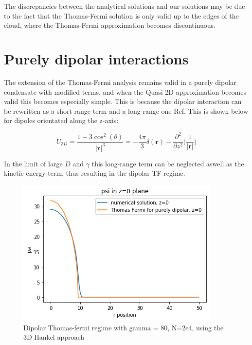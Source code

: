 \documentclass[10pt]{article}
\numberwithin{equation}{section}
\begin{document}
\begin{multicols}{2}
The discrepancies between the analytical solutions and our solutions may be due to the fact that the Thomas-Fermi solution is only valid up to the edges of the cloud, where the Thomas-Fermi approximation becomes discontinuous.

\section{Purely dipolar interactions}
The extension of the Thomas-Fermi analysis remains valid in a purely dipolar condensate with modified terms, and when the Quasi 2D approximation becomes valid this becomes especially simple. This is because the dipolar interaction can be rewritten as a short-range term and a long-range one Ref\cite{Bao_2013}. This is shown below for dipoles orientated along the z-axis:

\begin{equation}
U_{3D} = \frac{1-3\cos^2(\theta)}{|\textbf{r}|^3} = -\frac{4\pi}{3}\delta(\textbf{r}) - \frac{\partial^2}{\partial z^2}\bigg(\frac{1}{|\textbf{r}|}\bigg)
\end{equation}

In the limit of large $D$ and $\gamma$ this long-range term can be neglected aswell as the kinetic energy term, thus resulting in the dipolar TF regime.


\begin{figure}[H]
\centering
\includegraphics[width=0.8\linewidth]{Dipolar Thomas Fermi 3D Hankel gamma = 80 No=2e4}
\caption{Dipolar Thomas-fermi regime with gamma = 80, N=2e4, using the 3D Hankel approach}
\end{figure}


\end{multicols}
\end{document}
